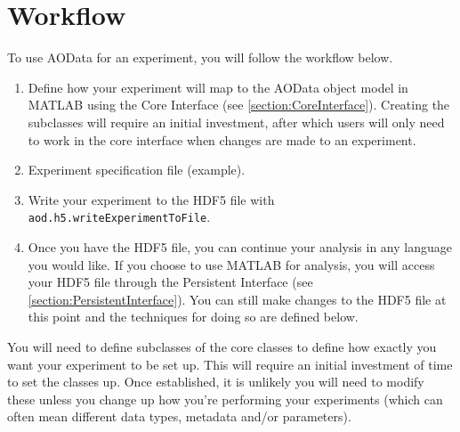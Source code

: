 \documentclass[10pt]{exam}
\newcommand\myurl[1]{\textcolor{blue}{\underline{#1}}}
\newcommand\aodfcn[1]{\textcolor{darkteal}{\texttt{#1}}}
\begin{document}
\section{Workflow}
	\label{section:Workflow}
	\noindent To use AOData for an experiment, you will follow the workflow below. 
	\begin{enumerate}
		\item Define how your experiment will map to the AOData object model in MATLAB using the Core Interface (see \myurl{\ref{section:CoreInterface}}). Creating the subclasses will require an initial investment, after which users will only need to work in the core interface when changes are made to an experiment. 
		\item Experiment specification file (example). 
		\item Write your experiment to the HDF5 file with \aodfcn{aod.h5.writeExperimentToFile}.
		\item Once you have the HDF5 file, you can continue your analysis in any language you would like. If you choose to use MATLAB for analysis, you will access your HDF5 file through the Persistent Interface (see \myurl{\ref{section:PersistentInterface}}). You can still make changes to the HDF5 file at this point and the techniques for doing so are defined below.
	\end{enumerate}
	\noindent You will need to define subclasses of the core classes to define how exactly you want your experiment to be set up. This will require an initial investment of time to set the classes up. Once established, it is unlikely you will need to modify these unless you change up how you're performing your experiments (which can often mean different data types, metadata and/or parameters). 
\end{document}
